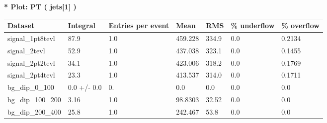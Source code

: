 \documentclass[a4paper, 10pt]{article}
\begin{document}
\textbf{* Plot: PT ( jets[1] ) }\\
   \begin{table}[H]
  \begin{center}
    \begin{tabular}{|m{23.0mm}|m{23.0mm}|m{18.0mm}|m{19.0mm}|m{19.0mm}|m{19.0mm}|m{19.0mm}|}
      \hline
      {\cellcolor{yellow}         Dataset}& {\cellcolor{yellow}         Integral}& {\cellcolor{yellow}         Entries per event}& {\cellcolor{yellow}         Mean}& {\cellcolor{yellow}         RMS}& {\cellcolor{yellow}         \% underflow}& {\cellcolor{yellow}         \% overflow}\\
      \hline
      {\cellcolor{white}         signal\_1pt8tevl}& {\cellcolor{white}         87.9}& {\cellcolor{white}         1.0}& {\cellcolor{white}         459.228}& {\cellcolor{white}         334.9}& {\cellcolor{green}         0.0}& {\cellcolor{green}         0.2134}\\
      \hline
      {\cellcolor{white}         signal\_2tevl}& {\cellcolor{white}         52.9}& {\cellcolor{white}         1.0}& {\cellcolor{white}         437.038}& {\cellcolor{white}         323.1}& {\cellcolor{green}         0.0}& {\cellcolor{green}         0.1455}\\
      \hline
      {\cellcolor{white}         signal\_2pt2tevl}& {\cellcolor{white}         34.1}& {\cellcolor{white}         1.0}& {\cellcolor{white}         423.006}& {\cellcolor{white}         318.2}& {\cellcolor{green}         0.0}& {\cellcolor{green}         0.1769}\\
      \hline
      {\cellcolor{white}         signal\_2pt4tevl}& {\cellcolor{white}         23.3}& {\cellcolor{white}         1.0}& {\cellcolor{white}         413.537}& {\cellcolor{white}         314.0}& {\cellcolor{green}         0.0}& {\cellcolor{green}         0.1711}\\
      \hline
      {\cellcolor{white}         bg\_dip\_0\_100}& {\cellcolor{white}         0.0 +/\-- 0.0}& {\cellcolor{white}         0.}& {\cellcolor{white}         0.0}& {\cellcolor{white}         0.0}& {\cellcolor{green}         0.0}& {\cellcolor{green}         0.0}\\
      \hline
      {\cellcolor{white}         bg\_dip\_100\_200}& {\cellcolor{white}         3.16}& {\cellcolor{white}         1.0}& {\cellcolor{white}         98.8303}& {\cellcolor{white}         32.52}& {\cellcolor{green}         0.0}& {\cellcolor{green}         0.0}\\
      \hline
      {\cellcolor{white}         bg\_dip\_200\_400}& {\cellcolor{white}         25.8}& {\cellcolor{white}         1.0}& {\cellcolor{white}         242.467}& {\cellcolor{white}         53.8}& {\cellcolor{green}         0.0}& {\cellcolor{green}         0.0}\\

\end{tabular}
\end{center}
\end{table}
\end{document}
